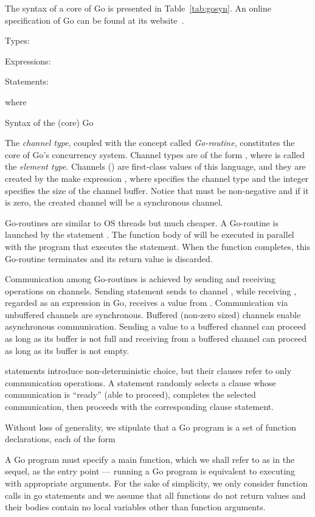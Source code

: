 \documentclass[runningheads, envcountsame, a4paper]{llncs}
\begin{document}
The syntax of a core of Go is presented in Table~\ref{tab:gosyn}.
An online specification of Go can be found at its website~\cite{GoSpec2012}.

\begin{table}
Types:

Expressions:

Statements:


where

\caption{Syntax of the (core) Go}
  \label{tab:gosyn}
\end{table}

The \emph{channel type}, coupled with the concept called \emph{Go-routine}, constitutes the core of
Go's concurrency system.
Channel types are of the form , where  is called the \emph{element type}.
Channels () are first-class values of this language,
and they  are created by the make expression ,
where  specifies the channel type and the integer  specifies the size of the channel buffer.
Notice that  must be non-negative and if it is zero, the created channel will be a synchronous channel.

Go-routines are similar to OS threads but much cheaper.
A Go-routine is launched by the statement .
The function body of  will be executed in parallel with the program that executes the  statement.
When the function completes, this Go-routine terminates and its return value is discarded.

Communication among Go-routines is achieved by sending and receiving operations on channels.
Sending statement  sends  to channel , while receiving ,
regarded as an expression in Go, receives a value from .
Communication via unbuffered channels are synchronous.
Buffered (non-zero sized) channels enable asynchronous communication.
Sending a value to a buffered channel can proceed as long as its buffer is not full
and receiving from a buffered channel can proceed as long as its buffer is not empty.

 statements introduce non-deterministic choice, but their clauses refer to only communication operations.
A  statement randomly selects a clause whose communication is ``ready'' (able to proceed),
completes the selected communication, then proceeds with the corresponding clause statement.

Without loss of generality, we stipulate that a Go program is a set of function declarations,
each of the form

A Go program must specify a main function, which we shall refer to as  in the sequel, as the entry point ---
running a Go program is equivalent to executing  with appropriate arguments.
For the sake of simplicity, we only consider function calls in go statements and we assume that
all functions do not return values and  their bodies contain no local variables other than function arguments.
\end{document}
